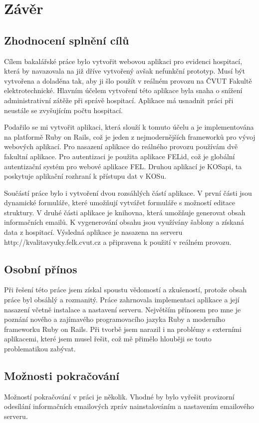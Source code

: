 \chapter{Závěr}

\section{Zhodnocení splnění cílů}
Cílem bakalářské práce bylo vytvořit webovou aplikaci pro evidenci hospitací, která by navazovala  na již dříve vytvořený avšak nefunkční prototyp. Musí být vytvořena a doladěna tak, aby ji šlo použít v reálném provozu na ČVUT Fakultě elektrotechnické. Hlavním účelem vytvoření této aplikace byla snaha o snížení administrativní zátěže při správě hospitací. Aplikace má usnadnit práci při neustále se zvyšujícím počtu hospitací.

Podařilo se mi vytvořit aplikaci, která slouží k tomuto účelu a je implementována na platformě Ruby on Rails, což je jeden z nejmodernějších frameworků pro vývoj webových aplikací. Pro nasazení aplikace do reálného provozu používám dvě fakultní aplikace. Pro autentizaci je použita aplikace FELid, což je globální autentizační systém pro webové aplikace FEL. Druhou aplikací je KOSapi, ta poskytuje aplikační rozhraní k přístupu dat v KOSu.

Součástí práce bylo i vytvoření dvou rozsáhlých částí aplikace. V první části  jsou dynamické formuláře, které umožňují vytvářet formuláře s možností editace struktury. V druhé části aplikace je knihovna, která umožňuje generovat obsah informačních emailů. K vygenerování obsahu jsou využívány šablony a získaná data z hospitací. Výsledná aplikace je nasazena na serveru http://kvalitavyuky.felk.cvut.cz a připravena k použití v reálném provozu. 

\section{Osobní přínos}
Při řešení této práce jsem získal spoustu vědomostí a zkušeností, protože obsah práce byl obsáhlý a rozmanitý. Práce zahrnovala implementaci aplikace a její nasazení včetně instalace a nastavení serveru. Největším přínosem pro mne je poznání nového a zajímavého programovacího jazyka Ruby a moderního frameworku Ruby on Rails. Při tvorbě jsem narazil i na problémy s externími aplikacemi, které jsem musel řešit, což mě přimělo hlouběji se touto problematikou zabývat.

\section{Možnosti pokračování}
Možností pokračování v práci je několik. Vhodné by bylo vyřešit provizorní odesílání informačních emailových zpráv nainstalováním a nastavením emailového serveru. 

